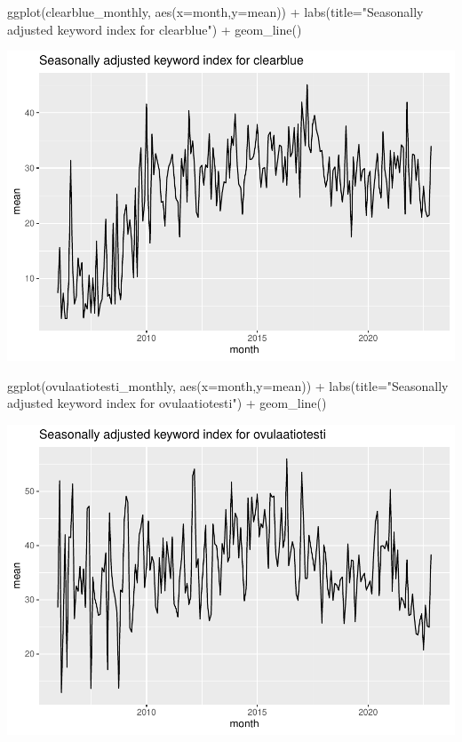 \documentclass[
]{article}
\newenvironment{Shaded}{\begin{snugshade}}{\end{snugshade}}
\newcommand{\AttributeTok}[1]{\textcolor[rgb]{0.77,0.63,0.00}{#1}}
\newcommand{\FunctionTok}[1]{\textcolor[rgb]{0.00,0.00,0.00}{#1}}
\newcommand{\NormalTok}[1]{#1}
\newcommand{\SpecialCharTok}[1]{\textcolor[rgb]{0.00,0.00,0.00}{#1}}
\newcommand{\StringTok}[1]{\textcolor[rgb]{0.31,0.60,0.02}{#1}}
\begin{document}
\begin{Shaded}
\begin{Highlighting}[]
\FunctionTok{ggplot}\NormalTok{(clearblue\_monthly, }\FunctionTok{aes}\NormalTok{(}\AttributeTok{x=}\NormalTok{month,}\AttributeTok{y=}\NormalTok{mean)) }\SpecialCharTok{+} \FunctionTok{labs}\NormalTok{(}\AttributeTok{title=}\StringTok{"Seasonally adjusted keyword index for clearblue"}\NormalTok{) }\SpecialCharTok{+} \FunctionTok{geom\_line}\NormalTok{()}
\end{Highlighting}
\end{Shaded}

\includegraphics{GoogleTrendsMarkdown_files/figure-latex/unnamed-chunk-9-2.pdf}

\begin{Shaded}
\begin{Highlighting}[]
\FunctionTok{ggplot}\NormalTok{(ovulaatiotesti\_monthly, }\FunctionTok{aes}\NormalTok{(}\AttributeTok{x=}\NormalTok{month,}\AttributeTok{y=}\NormalTok{mean)) }\SpecialCharTok{+} \FunctionTok{labs}\NormalTok{(}\AttributeTok{title=}\StringTok{"Seasonally adjusted keyword index for ovulaatiotesti"}\NormalTok{) }\SpecialCharTok{+} \FunctionTok{geom\_line}\NormalTok{()}
\end{Highlighting}
\end{Shaded}

\includegraphics{GoogleTrendsMarkdown_files/figure-latex/unnamed-chunk-9-3.pdf}
\end{document}
